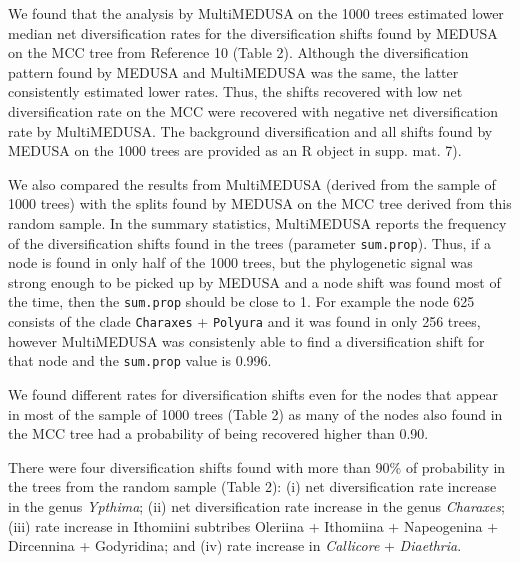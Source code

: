 \documentclass[10pt]{article}
\begin{document}
We found that the analysis by MultiMEDUSA on the 1000 trees estimated
lower median net diversification rates for the diversification shifts
found by MEDUSA on the MCC tree from Reference 10 (Table 2). Although
the diversification pattern found by MEDUSA and MultiMEDUSA was the
same, the latter consistently estimated lower rates. Thus, the shifts
recovered with low net diversification rate on the MCC were recovered
with negative net diversification rate by MultiMEDUSA. The background
diversification and all shifts found by MEDUSA on the 1000 trees are
provided as an R object in supp. mat. 7).

We also compared the results from MultiMEDUSA (derived from the sample
of 1000 trees) with the splits found by MEDUSA on the MCC tree derived
from this random sample. In the summary statistics, MultiMEDUSA reports
the frequency of the diversification shifts found in the trees
(parameter \texttt{sum.prop}). Thus, if a node is found in only half of
the 1000 trees, but the phylogenetic signal was strong enough to be
picked up by MEDUSA and a node shift was found most of the time, then
the \texttt{sum.prop} should be close to 1. For example the node 625
consists of the clade \texttt{Charaxes} + \texttt{Polyura} and it was
found in only 256 trees, however MultiMEDUSA was consistenly able to
find a diversification shift for that node and the \texttt{sum.prop}
value is 0.996.

We found different rates for diversification shifts even for the nodes
that appear in most of the sample of 1000 trees (Table 2) as many of the
nodes also found in the MCC tree had a probability of being recovered
higher than 0.90.

There were four diversification shifts found with more than 90\% of
probability in the trees from the random sample (Table 2): (i) net
diversification rate increase in the genus \emph{Ypthima}; (ii) net
diversification rate increase in the genus \emph{Charaxes}; (iii) rate
increase in Ithomiini subtribes Oleriina + Ithomiina + Napeogenina +
Dircennina + Godyridina; and (iv) rate increase in \emph{Callicore} +
\emph{Diaethria}.
\end{document}
